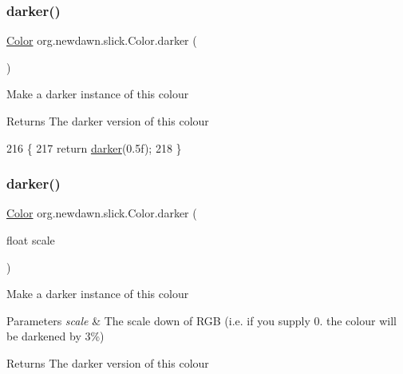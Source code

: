 \subsubsection{\texorpdfstring{darker()}{darker()}\hspace{0.1cm}{\footnotesize\ttfamily [1/2]}}
{\footnotesize\ttfamily \mbox{\hyperlink{classorg_1_1newdawn_1_1slick_1_1_color}{Color}} org.\+newdawn.\+slick.\+Color.\+darker (\begin{DoxyParamCaption}{ }\end{DoxyParamCaption})\hspace{0.3cm}{\ttfamily [inline]}}

Make a darker instance of this colour

\begin{DoxyReturn}{Returns}
The darker version of this colour 
\end{DoxyReturn}

\begin{DoxyCode}
216                           \{
217         \textcolor{keywordflow}{return} \mbox{\hyperlink{classorg_1_1newdawn_1_1slick_1_1_color_a73c0dbf7349167bcc646ff07cff719a1}{darker}}(0.5f);
218     \}
\end{DoxyCode}
\mbox{\label{classorg_1_1newdawn_1_1slick_1_1_color_a3795be826980a3b60fdab1e7d811104a}} 
\subsubsection{\texorpdfstring{darker()}{darker()}\hspace{0.1cm}{\footnotesize\ttfamily [2/2]}}
{\footnotesize\ttfamily \mbox{\hyperlink{classorg_1_1newdawn_1_1slick_1_1_color}{Color}} org.\+newdawn.\+slick.\+Color.\+darker (\begin{DoxyParamCaption}\item[{float}]{scale }\end{DoxyParamCaption})\hspace{0.3cm}{\ttfamily [inline]}}

Make a darker instance of this colour


\begin{DoxyParams}{Parameters}
{\em scale} & The scale down of R\+GB (i.\+e. if you supply 0. the colour will be darkened by 3\%) \\
\hline
\end{DoxyParams}
\begin{DoxyReturn}{Returns}
The darker version of this colour 
\end{DoxyReturn}

